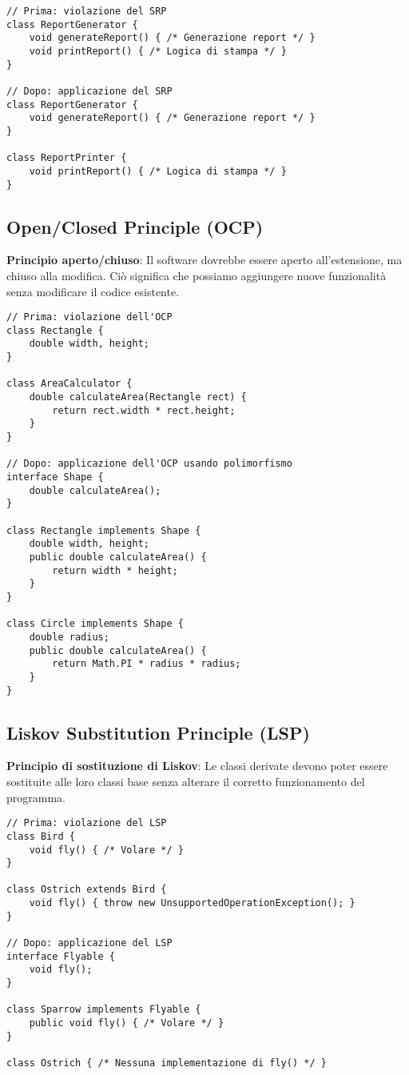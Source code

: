 \documentclass{article}
\begin{document}
\begin{lstlisting}
// Prima: violazione del SRP
class ReportGenerator {
    void generateReport() { /* Generazione report */ }
    void printReport() { /* Logica di stampa */ }
}

// Dopo: applicazione del SRP
class ReportGenerator {
    void generateReport() { /* Generazione report */ }
}

class ReportPrinter {
    void printReport() { /* Logica di stampa */ }
}
\end{lstlisting}

\subsection{Open/Closed Principle (OCP)}
\textbf{Principio aperto/chiuso}: Il software dovrebbe essere aperto all'estensione, ma chiuso alla modifica. Ciò significa che possiamo aggiungere nuove funzionalità senza modificare il codice esistente.

\begin{lstlisting}
// Prima: violazione dell'OCP
class Rectangle {
    double width, height;
}

class AreaCalculator {
    double calculateArea(Rectangle rect) {
        return rect.width * rect.height;
    }
}

// Dopo: applicazione dell'OCP usando polimorfismo
interface Shape {
    double calculateArea();
}

class Rectangle implements Shape {
    double width, height;
    public double calculateArea() {
        return width * height;
    }
}

class Circle implements Shape {
    double radius;
    public double calculateArea() {
        return Math.PI * radius * radius;
    }
}
\end{lstlisting}

\subsection{Liskov Substitution Principle (LSP)}
\textbf{Principio di sostituzione di Liskov}: Le classi derivate devono poter essere sostituite alle loro classi base senza alterare il corretto funzionamento del programma.

\begin{lstlisting}
// Prima: violazione del LSP
class Bird {
    void fly() { /* Volare */ }
}

class Ostrich extends Bird {
    void fly() { throw new UnsupportedOperationException(); }
}

// Dopo: applicazione del LSP
interface Flyable {
    void fly();
}

class Sparrow implements Flyable {
    public void fly() { /* Volare */ }
}

class Ostrich { /* Nessuna implementazione di fly() */ }
\end{lstlisting}
\end{document}
